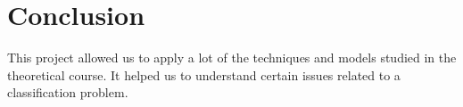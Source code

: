 \documentclass[a4paper, 11pt, oneside]{article}
\begin{document}
\section{Conclusion}

This project allowed us to apply a lot of the techniques and models studied in the theoretical course. It helped us to understand certain issues related to a classification problem.

\end{document}
